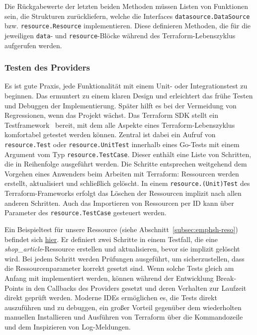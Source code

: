 \documentclass[paper=a4,11pt,numbers=noenddot]{article}
\begin{document}
Die Rückgabewerte der letzten beiden Methoden müssen Listen von Funktionen sein, die Strukturen zurückliefern, welche die Interfaces \verb'datasource.DataSource' bzw. \verb'resource.Resource' implementieren. Diese definieren Methoden, die für die jeweiligen \verb'data'- und \verb'resource'-Blöcke während des Terraform-Lebenszyklus aufgerufen werden.

\subsubsection{Testen des Providers}
\label{subsubsec:note-on-testing}

Es ist gute Praxis, jede Funktionalität mit einem Unit- oder Integrationstest zu beginnen. Das ermuntert zu einem klaren Design und erleichtert das frühe Testen und Debuggen der Implementierung. Später hilft es bei der Vermeidung von Regressionen, wenn das Projekt wächst. Das Terraform SDK stellt ein Testframework~\autocite{noauthor_terraform_acceptance_testing_nodate} bereit, mit dem alle Aspekte eines Terraform-Lebenszyklus komfortabel getestet werden können. Zentral ist dabei ein Aufruf von \verb'resource.Test' oder \verb'resource.UnitTest' innerhalb eines Go-Tests mit einem Argument vom Typ \verb'resource.TestCase'. Dieser enthält eine Liste von Schritten, die in Reihenfolge ausgeführt werden. Die Schritte entsprechen weitgehend dem Vorgehen eines Anwenders beim Arbeiten mit Terraform: Ressourcen werden erstellt, aktualisiert und schließlich gelöscht. In einem \verb'resource.(Unit)Test' des Terraform-Frameworks erfolgt das Löschen der Ressourcen implizit nach allen anderen Schritten. Auch das Importieren von Ressourcen per ID kann über Parameter des \verb'resource.TestCase' gesteuert werden.

Ein Beispieltest für unsere Ressource (siehe Abschnitt~\ref{subsec:emphsh-reso}) befindet sich \href{https://github.com/ecky-l/terraform-provider-example/blob/main/src/tfp-example/example/shop_article_resource_test.go}{hier}. Er definiert zwei Schritte in einem Testfall, die eine \emph{shop\_article}-Ressource erstellen und aktualisieren, bevor sie implizit gelöscht wird. Bei jedem Schritt werden Prüfungen ausgeführt, um sicherzustellen, dass die Ressourcenparameter korrekt gesetzt sind. Wenn solche Tests gleich am Anfang mit implementiert werden, können während der Entwicklung Break-Points in den Callbacks des Providers gesetzt und deren Verhalten zur Laufzeit direkt geprüft werden. Moderne IDEs ermöglichen es, die Tests direkt auszuführen und zu debuggen, ein großer Vorteil gegenüber dem wiederholten manuellen Installieren und Ausführen von Terraform über die Kommandozeile und dem Inspizieren von Log-Meldungen.
\end{document}
